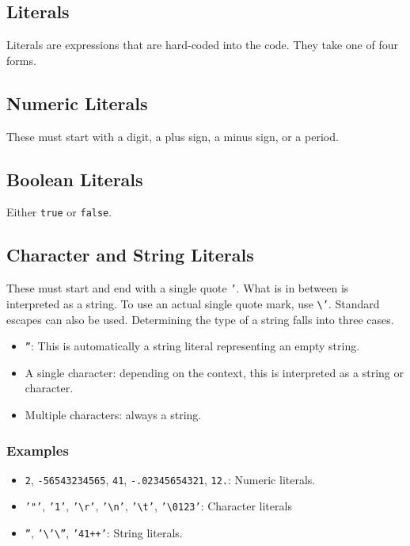 \documentclass{article}
\newcommand{\code}[1]{\texttt{#1}}
\begin{document}
\subsection{Literals}
Literals are expressions that are hard-coded into the code. They take one of four forms.
\subsection{Numeric Literals}
These must start with a digit, a plus sign, a minus sign, or a period.
\subsection{Boolean Literals}
Either \code{true} or \code{false}.
\subsection{Character and String Literals}
These must start and end with a single quote \code{'}. What is in between is interpreted as a string. To use an actual single quote mark, use \code{\textbackslash'}. Standard escapes can also be used. Determining the type of a string falls into three cases.
\begin{itemize}
\item \code{''}: This is automatically a string literal representing an empty string.
\item A single character: depending on the context, this is interpreted as a string or character.
\item Multiple characters: always a string.
\end{itemize}
\subsubsection{Examples}
\begin{itemize}
\item \code{2}, \code{-56543234565}, \code{41}, \code{-.02345654321}, \code{12.}: Numeric literals.
\item \code{'"'}, \code{'1'}, \code{'\textbackslash{}r'}, \code{'\textbackslash{}n'}, \code{'\textbackslash{}t'}, \code{'\textbackslash{}0123'}: Character literals
\item \code{''}, \code{'\textbackslash'\textbackslash''}, \code{'41++'}: String literals.
\end{itemize}
\end{document}
